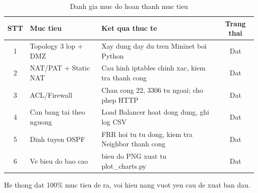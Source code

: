 \begin{table}[H]
\centering
\caption{Danh gia muc do hoan thanh muc tieu}
\vspace{0.3cm}
\begin{tabularx}{\textwidth}{|c|>{\raggedright\arraybackslash}p{4.5cm}|>{\raggedright\arraybackslash}X|c|}
    \hline
    \textbf{STT} & \textbf{Muc tieu} & \textbf{Ket qua thuc te} & \textbf{Trang thai} \\ \hline
    1 & Topology 3 lop + DMZ & Xay dung day du tren Mininet boi Python & Dat \\ \hline
    2 & NAT/PAT + Static NAT & Cau hinh iptables chinh xac, kiem tra thanh cong & Dat \\ \hline
    3 & ACL/Firewall & Chan cong 22, 3306 tu ngoai; cho phep HTTP & Dat \\ \hline
    4 & Can bang tai theo nguong & Load Balancer hoat dong dung, ghi log CSV & Dat \\ \hline
    5 & Dinh tuyen OSPF & FRR hoi tu tu dong, kiem tra Neighbor thanh cong & Dat \\ \hline
    6 & Ve bieu do bao cao & 7 bieu do PNG xuat tu plot\_charts.py & Dat \\ \hline
\end{tabularx}
\label{tab:objectives}
\end{table}

He thong dat 100\% muc tieu de ra, voi hieu nang vuot yeu cau de xuat ban dau.
